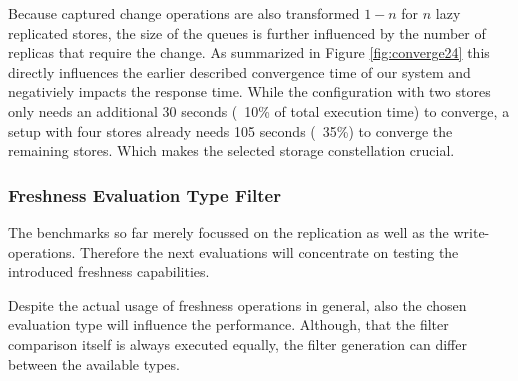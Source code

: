 Because captured change operations are also transformed $1-n$ for $n$ lazy replicated stores, the size of the queues is further influenced by the number of replicas that
require the change. 
As summarized in Figure \ref{fig:converge24} this directly influences the earlier described convergence time of our system and negativiely impacts the response time.
While the configuration with two stores only needs an additional 30 seconds (~10\% of total execution time) to converge, a setup with four stores
already needs 105 seconds (~35\%) to converge the remaining stores.
Which makes the selected storage constellation crucial.









\subsubsection{Freshness Evaluation Type Filter} 

The benchmarks so far merely focussed on the replication as well as the write-operations.
Therefore the next evaluations will concentrate on testing the introduced freshness capabilities.

Despite the actual usage of freshness operations in general, also the chosen evaluation type will influence the performance.
Although, that the filter comparison itself is always executed equally, the filter generation can differ between the available types.

